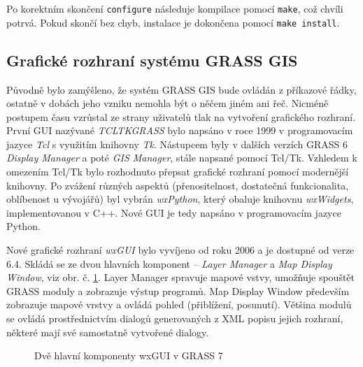 \documentclass[a4paper,12pt,draft]{article}
\begin{document}
Po korektním skončení \verb|configure| následuje kompilace pomocí \verb|make|, což chvíli potrvá. Pokud skončí bez chyb, instalace je dokončena pomocí \verb|make install|. 


\subsection{Grafické rozhraní systému GRASS GIS}
Původně bylo zamýšleno, že systém GRASS GIS bude ovládán z příkazové řádky, ostatně v dobách jeho vzniku nemohla být o něčem jiném ani řeč. Nicméně postupem času vzrůstal ze strany uživatelů tlak na vytvoření grafického rozhraní. První GUI nazývané \emph{TCLTKGRASS} bylo napsáno v roce 1999 v programovacím jazyce \emph{Tcl} s využitím knihovny \emph{Tk}. Nástupcem byly v dalších verzích GRASS 6 \emph{Display Manager} a poté \emph{GIS Manager}, stále napsané pomocí Tcl/Tk. Vzhledem k omezením Tcl/Tk bylo rozhodnuto přepsat grafické rozhraní pomocí modernější knihovny. Po zvážení různých aspektů (přenositelnost, dostatečná funkcionalita, oblíbenost u vývojářů) byl vybrán \emph{wxPython}, který obaluje knihovnu \emph{wxWidgets}, implementovanou v C++. Nové GUI je tedy napsáno v programovacím jazyce Python. 

Nové grafické rozhraní \emph{wxGUI} bylo vyvíjeno od roku 2006 a je dostupné od verze 6.4. Skládá se ze dvou hlavních komponent -- \emph{Layer Manager} a \emph{Map Display Window}, viz obr. č. \ref{fig:wxgui}. Layer Manager spravuje mapové vstvy, umožňuje spouštět GRASS moduly a zobrazuje výstup programů. Map Display Window především zobrazuje mapové vrstvy a ovládá pohled (přiblížení, posunutí). Většina modulů se ovládá prostřednictvím dialogů generovaných z XML popisu jejich rozhraní, některé mají své samostatně vytvořené dialogy.
\begin{figure}[h!]
\centering
{}   \quad              
{}  
\caption{Dvě hlavní komponenty wxGUI v GRASS 7\label{fig:wxgui}}

\end{figure}
\end{document}
